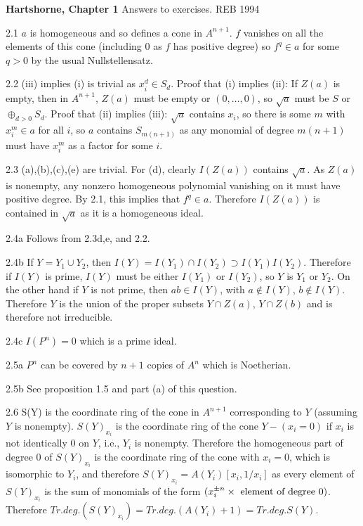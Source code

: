 \def\Z{{\bf Z}}
{\bf Hartshorne, Chapter 1}
Answers to exercises. \hfill REB 1994
\item{2.1} $a$ is homogeneous and so defines a cone in 
$A^{n+1}$. $f$ vanishes on all the elements of this cone
(including 0 as $f$ has positive degree) so $f^q\in a$
for some $q>0$ by the usual Nullstellensatz. 
\item{2.2} (iii) implies (i) is trivial as $x_i^d\in S_d$. 
Proof that (i) implies (ii):  If $Z(a)$ is empty, then in 
$A^{n+1} $, $Z(a)$ must be empty or $(0,\ldots,0)$, so $\sqrt a$
must be $S$ or $\oplus_{d>0}S_d$. 
Proof that (ii) implies (iii):
 $\sqrt a $ contains $x_i$, so there is some $m$ with
$x_i^m\in a$ for all $i$, so $a$ contains $S_{m(n+1)}$ as any monomial of degree
$m(n+1)$ must have $x_i^m$ as a factor for some $i$. 
\item{2.3} (a),(b),(c),(e) are trivial. For (d), clearly $I(Z(a))$
contains $\sqrt a$. As $Z(a)$ is nonempty, any nonzero homogeneous polynomial
vanishing on it must have positive degree. By 2.1, this implies that
$f^q\in a$.
Therefore $I(Z(a))$ is contained in $\sqrt a$ as it is a
homogeneous ideal.  
\item{2.4a} Follows from 2.3d,e, and 2.2.
\item{2.4b} If $Y=Y_1\cup Y_2$, then $I(Y)=I(Y_1)\cap I(Y_2)\supset
I(Y_1)I(Y_2)$. Therefore if $I(Y)$ is prime, $I(Y)$ must be either
$I(Y_1)$ or $I(Y_2)$, so $Y$ is $Y_1$ or $Y_2$. 
On the other hand if $Y$ is not prime, then $ab\in I(Y)$,
with $a\notin I(Y)$, $b\notin I(Y)$. Therefore $Y$ is the union of the proper
subsets $Y\cap Z(a)$, $Y\cap Z(b)$
and is therefore not irreducible. 
\item{2.4c} $I(P^n)=0$ which is a prime ideal.
\item{2.5a} $P^n$ can be covered by $n+1$ copies of $A^n$ which is
Noetherian. 
\item{2.5b} See proposition 1.5 and part (a) of this question. 
\item{2.6} S(Y) is the coordinate ring of the cone in $A^{n+1}$
corresponding to $Y$ (assuming $Y$ is nonempty).
$S(Y)_{x_i}$ is the coordinate ring of the cone $Y-(x_i=0)$
if $x_i$ is not identically 0 on $Y$, i.e., $Y_i$ is nonempty. Therefore
the homogeneous part of degree 0 of $S(Y)_{x_i}$ is the coordinate ring of
the cone with $x_i=0$, which is isomorphic to $Y_i$, and therefore
$S(Y)_{x_i}=A(Y_i)[x_i,1/x_i]$ as every element of 
$S(Y)_{x_i}$ is the sum of monomials of the form $(x_i^{\pm n}\times
\hbox{ element of degree 0})$. Therefore 
$Tr.deg.(S(Y)_{x_i}) = Tr.deg. (A(Y_i)+1) = Tr.deg. S(Y)$. 
